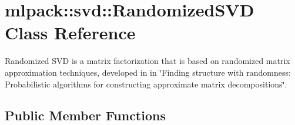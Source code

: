 \section{mlpack\+:\+:svd\+:\+:Randomized\+S\+VD Class Reference}
\label{classmlpack_1_1svd_1_1RandomizedSVD}


Randomized S\+VD is a matrix factorization that is based on randomized matrix approximation techniques, developed in in \char`\"{}\+Finding structure with randomness\+:
\+Probabilistic algorithms for constructing approximate matrix decompositions\char`\"{}.  


\subsection*{Public Member Functions}
